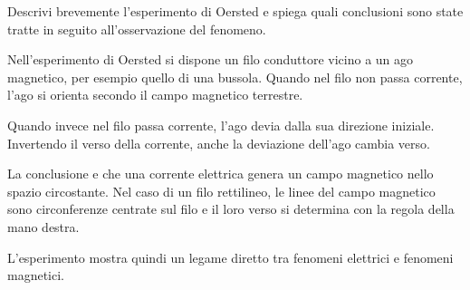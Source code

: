
\begin{esercizio}
Descrivi brevemente l'esperimento di Oersted e spiega quali conclusioni sono
state tratte in seguito all'osservazione del fenomeno.
\end{esercizio}

\begin{soluzione}
Nell'esperimento di Oersted si dispone un filo conduttore vicino a un ago
magnetico, per esempio quello di una bussola. Quando nel filo non passa
corrente, l'ago si orienta secondo il campo magnetico terrestre.

Quando invece nel filo passa corrente, l'ago devia dalla sua direzione iniziale.
Invertendo il verso della corrente, anche la deviazione dell'ago cambia verso.

La conclusione e che una corrente elettrica genera un campo magnetico nello
spazio circostante. Nel caso di un filo rettilineo, le linee del campo magnetico
sono circonferenze centrate sul filo e il loro verso si determina con la regola
della mano destra.

L'esperimento mostra quindi un legame diretto tra fenomeni elettrici e fenomeni
magnetici.
\end{soluzione}
